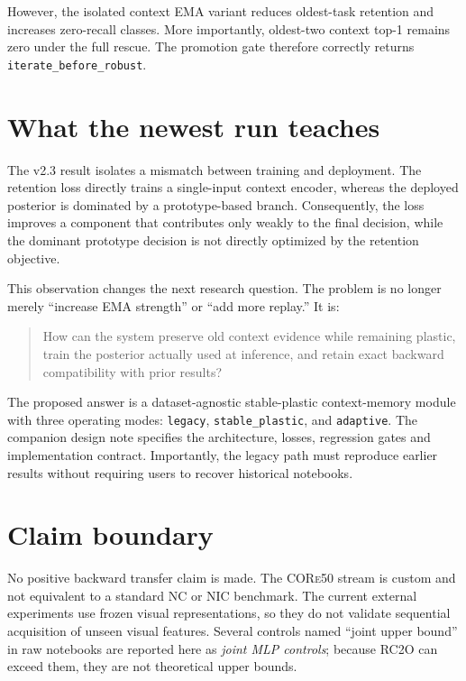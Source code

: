 \documentclass[10pt]{article}
\newcommand{\rc}{\textsc{RC2O}}
\newcommand{\core}{\textsc{CORe50}}
\begin{document}
However, the isolated context EMA variant reduces oldest-task retention and increases zero-recall classes. More importantly, oldest-two context top-1 remains zero under the full rescue. The promotion gate therefore correctly returns \texttt{iterate\_before\_robust}.

\begin{table}[H]
\centering
\caption{Promotion-gate evidence.}

\end{table}

\section{What the newest run teaches}
The v2.3 result isolates a mismatch between training and deployment. The retention loss directly trains a single-input context encoder, whereas the deployed posterior is dominated by a prototype-based branch. Consequently, the loss improves a component that contributes only weakly to the final decision, while the dominant prototype decision is not directly optimized by the retention objective.

This observation changes the next research question. The problem is no longer merely ``increase EMA strength'' or ``add more replay.'' It is:
\begin{quote}
How can the system preserve old context evidence while remaining plastic, train the posterior actually used at inference, and retain exact backward compatibility with prior results?
\end{quote}

The proposed answer is a dataset-agnostic stable-plastic context-memory module with three operating modes: \texttt{legacy}, \texttt{stable\_plastic}, and \texttt{adaptive}. The companion design note specifies the architecture, losses, regression gates and implementation contract. Importantly, the legacy path must reproduce earlier results without requiring users to recover historical notebooks.

\section{Claim boundary}
\begin{table}[H]
\centering
\caption{Supported and unsupported external claims.}

\end{table}

No positive backward transfer claim is made. The \core{} stream is custom and not equivalent to a standard NC or NIC benchmark. The current external experiments use frozen visual representations, so they do not validate sequential acquisition of unseen visual features. Several controls named ``joint upper bound'' in raw notebooks are reported here as \emph{joint MLP controls}; because \rc{} can exceed them, they are not theoretical upper bounds.
\end{document}
